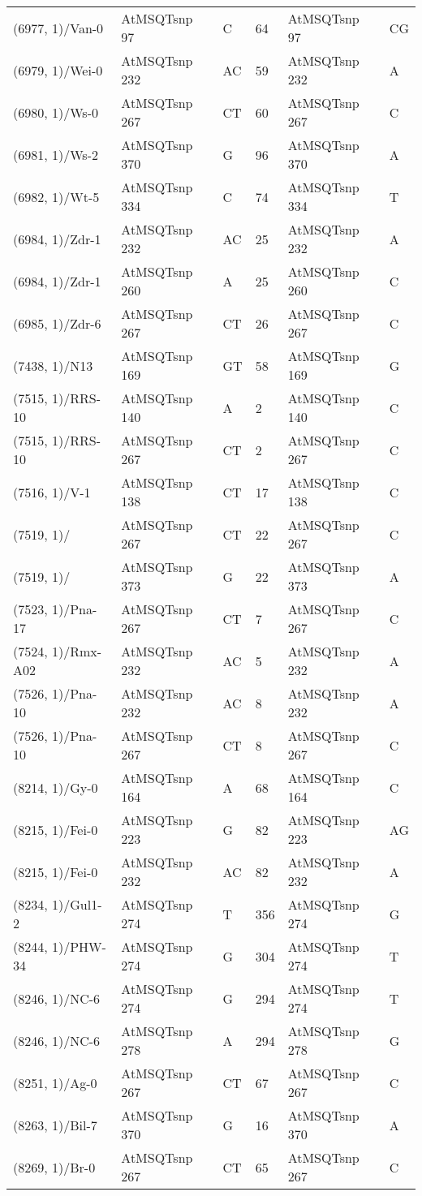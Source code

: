 \begin{center}
\begin{longtable}{|l|l|l|l|l|l|}
(6977, 1)/Van-0&AtMSQTsnp 97&C&64&AtMSQTsnp 97&CG\\
(6979, 1)/Wei-0&AtMSQTsnp 232&AC&59&AtMSQTsnp 232&A\\
(6980, 1)/Ws-0&AtMSQTsnp 267&CT&60&AtMSQTsnp 267&C\\
(6981, 1)/Ws-2&AtMSQTsnp 370&G&96&AtMSQTsnp 370&A\\
(6982, 1)/Wt-5&AtMSQTsnp 334&C&74&AtMSQTsnp 334&T\\
(6984, 1)/Zdr-1&AtMSQTsnp 232&AC&25&AtMSQTsnp 232&A\\
(6984, 1)/Zdr-1&AtMSQTsnp 260&A&25&AtMSQTsnp 260&C\\
(6985, 1)/Zdr-6&AtMSQTsnp 267&CT&26&AtMSQTsnp 267&C\\
(7438, 1)/N13&AtMSQTsnp 169&GT&58&AtMSQTsnp 169&G\\
(7515, 1)/RRS-10&AtMSQTsnp 140&A&2&AtMSQTsnp 140&C\\
(7515, 1)/RRS-10&AtMSQTsnp 267&CT&2&AtMSQTsnp 267&C\\
(7516, 1)/V-1&AtMSQTsnp 138&CT&17&AtMSQTsnp 138&C\\
(7519, 1)/&AtMSQTsnp 267&CT&22&AtMSQTsnp 267&C\\
(7519, 1)/&AtMSQTsnp 373&G&22&AtMSQTsnp 373&A\\
(7523, 1)/Pna-17&AtMSQTsnp 267&CT&7&AtMSQTsnp 267&C\\
(7524, 1)/Rmx-A02&AtMSQTsnp 232&AC&5&AtMSQTsnp 232&A\\
(7526, 1)/Pna-10&AtMSQTsnp 232&AC&8&AtMSQTsnp 232&A\\
(7526, 1)/Pna-10&AtMSQTsnp 267&CT&8&AtMSQTsnp 267&C\\
(8214, 1)/Gy-0&AtMSQTsnp 164&A&68&AtMSQTsnp 164&C\\
(8215, 1)/Fei-0&AtMSQTsnp 223&G&82&AtMSQTsnp 223&AG\\
(8215, 1)/Fei-0&AtMSQTsnp 232&AC&82&AtMSQTsnp 232&A\\
(8234, 1)/Gul1-2&AtMSQTsnp 274&T&356&AtMSQTsnp 274&G\\
(8244, 1)/PHW-34&AtMSQTsnp 274&G&304&AtMSQTsnp 274&T\\
(8246, 1)/NC-6&AtMSQTsnp 274&G&294&AtMSQTsnp 274&T\\
(8246, 1)/NC-6&AtMSQTsnp 278&A&294&AtMSQTsnp 278&G\\
(8251, 1)/Ag-0&AtMSQTsnp 267&CT&67&AtMSQTsnp 267&C\\
(8263, 1)/Bil-7&AtMSQTsnp 370&G&16&AtMSQTsnp 370&A\\
(8269, 1)/Br-0&AtMSQTsnp 267&CT&65&AtMSQTsnp 267&C\\

\end{longtable}
\end{center}
